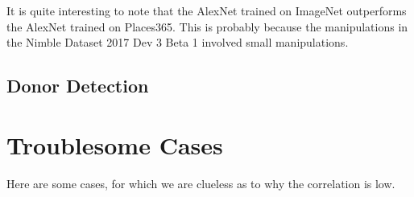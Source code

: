 \documentclass{article}
\begin{document}
It is quite interesting to note that the AlexNet trained on ImageNet outperforms the AlexNet trained on Places365. This is probably because the manipulations in the Nimble Dataset 2017 Dev 3 Beta 1 involved small manipulations.



\subsection{Donor Detection}

\section{Troublesome Cases}
Here are some cases, for which we are clueless as to why the correlation is low.



\end{document}
